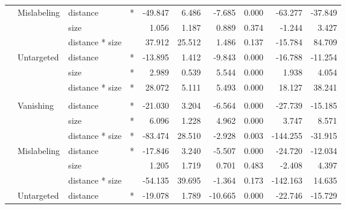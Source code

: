 \begin{longtable}[t]{llllrrrrrr}
\cmidrule{2-10}\nopagebreak
\hspace{1em} & Mislabeling & distance & * & -49.847 & 6.486 & -7.685 & 0.000 & -63.277 & -37.849\\
\cmidrule{3-10}\nopagebreak
\hspace{1em} &  & size &  & 1.056 & 1.187 & 0.889 & 0.374 & -1.244 & 3.427\\
\cmidrule{3-10}\nopagebreak
\hspace{1em} &  & distance * size &  & 37.912 & 25.512 & 1.486 & 0.137 & -15.784 & 84.709\\
\cmidrule{2-10}\nopagebreak
\hspace{1em} & Untargeted & distance & * & -13.895 & 1.412 & -9.843 & 0.000 & -16.788 & -11.254\\
\cmidrule{3-10}\nopagebreak
\hspace{1em} &  & size & * & 2.989 & 0.539 & 5.544 & 0.000 & 1.938 & 4.054\\
\cmidrule{3-10}\nopagebreak
\hspace{1em} &  & distance * size & * & 28.072 & 5.111 & 5.493 & 0.000 & 18.127 & 38.241\\
\cmidrule{1-10}\pagebreak[0]
\addlinespace[0.3em]
\multicolumn{10}{l}{\textbf{Faster R-CNN}}\\
\hspace{1em} & Vanishing & distance & * & -21.030 & 3.204 & -6.564 & 0.000 & -27.739 & -15.185\\
\cmidrule{3-10}\nopagebreak
\hspace{1em} &  & size & * & 6.096 & 1.228 & 4.962 & 0.000 & 3.747 & 8.571\\
\cmidrule{3-10}\nopagebreak
\hspace{1em} &  & distance * size & * & -83.474 & 28.510 & -2.928 & 0.003 & -144.255 & -31.915\\
\cmidrule{2-10}\nopagebreak
\hspace{1em} & Mislabeling & distance & * & -17.846 & 3.240 & -5.507 & 0.000 & -24.720 & -12.034\\
\cmidrule{3-10}\nopagebreak
\hspace{1em} &  & size &  & 1.205 & 1.719 & 0.701 & 0.483 & -2.408 & 4.397\\
\cmidrule{3-10}\nopagebreak
\hspace{1em} &  & distance * size &  & -54.135 & 39.695 & -1.364 & 0.173 & -142.163 & 14.635\\
\cmidrule{2-10}\nopagebreak
\hspace{1em} & Untargeted & distance & * & -19.078 & 1.789 & -10.665 & 0.000 & -22.746 & -15.729\\

\end{longtable}

